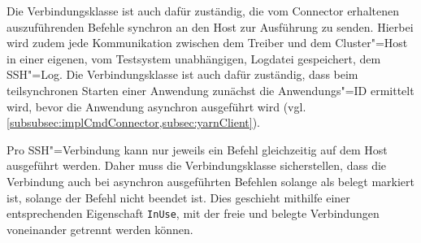 Die Verbindungsklasse ist auch dafür zuständig, die vom Connector erhaltenen auszuführenden Befehle synchron an den Host zur Ausführung zu senden.
Hierbei wird zudem jede Kommunikation zwischen dem Treiber und dem Cluster"=Host in einer eigenen, vom Testsystem unabhängigen, Logdatei gespeichert, dem SSH"=Log.
Die Verbindungsklasse ist auch dafür zuständig, dass beim teilsynchronen Starten einer Anwendung zunächst die Anwendungs"=ID ermittelt wird, bevor die Anwendung asynchron ausgeführt wird (vgl. \cref{subsubsec:implCmdConnector,subsec:yarnClient}).

Pro SSH"=Verbindung kann nur jeweils ein Befehl gleichzeitig auf dem Host ausgeführt werden.
Daher muss die Verbindungsklasse sicherstellen, dass die Verbindung auch bei asynchron ausgeführten Befehlen solange als belegt markiert ist, solange der Befehl nicht beendet ist.
Dies geschieht mithilfe einer entsprechenden Eigenschaft \texttt{InUse}, mit der freie und belegte Verbindungen voneinander getrennt werden können.

